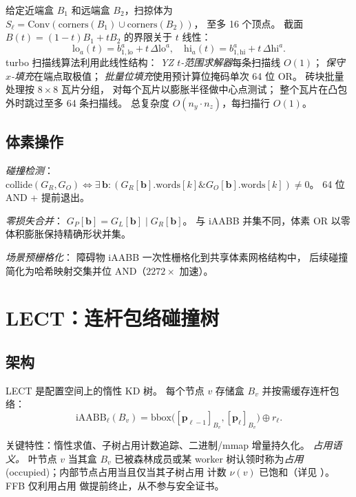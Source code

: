 \documentclass[journal]{IEEEtran}
\newcommand{\iAABB}{\mathrm{iAABB}}
\begin{document}
给定近端盒 $B_1$ 和远端盒 $B_2$，扫掠体为
$S_\ell = \mathrm{Conv}(\mathrm{corners}(B_1) \cup \mathrm{corners}(B_2))$，
至多 16 个顶点。
截面 $B(t) = (1-t)B_1 + tB_2$ 的界限关于 $t$ 线性：
\begin{equation}\label{eq:bt_linear}
  \mathrm{lo}_a(t) = b_{1,\mathrm{lo}}^a + t\,\Delta\mathrm{lo}^a, \quad
  \mathrm{hi}_a(t) = b_{1,\mathrm{hi}}^a + t\,\Delta\mathrm{hi}^a.
\end{equation}
turbo 扫描线算法利用此线性结构：
\emph{YZ $t$-范围求解器}每条扫描线 $O(1)$；
\emph{保守 $x$-填充}在端点取极值；
\emph{批量位填充}使用预计算位掩码单次 64 位 OR。
砖块批量处理按 $8{\times}8$ 瓦片分组，
对每个瓦片以膨胀半径做中心点测试；
整个瓦片在凸包外时跳过至多 64 条扫描线。
总复杂度 $O(n_y \cdot n_z)$，每扫描行 $O(1)$。

\subsection{体素操作}

\emph{碰撞检测}：
$\text{collide}(G_R, G_O) \Leftrightarrow \exists\,\bm{b}:
(G_R[\bm{b}].\text{words}[k] \mathbin{\&} G_O[\bm{b}].\text{words}[k]) \ne 0$。
64 位 AND + 提前退出。

\emph{零损失合并}：
$G_P[\bm{b}] = G_L[\bm{b}] \mathbin{|} G_R[\bm{b}]$。
与 iAABB 并集不同，体素 OR 以零体积膨胀保持精确形状并集。

\emph{场景预栅格化}：
障碍物 iAABB 一次性栅格化到共享体素网格结构中，
后续碰撞简化为哈希映射交集并位 AND（$2272{\times}$ 加速）。

\section{LECT：连杆包络碰撞树}\label{sec:lect}

\subsection{架构}

LECT 是配置空间上的惰性 KD 树。
每个节点 $v$ 存储盒 $B_v$ 并按需缓存连杆包络：
\begin{equation}
  \iAABB_\ell(B_v) = \mathrm{bbox}\bigl([\bm{p}_{\ell-1}]_{B_v},
  [\bm{p}_\ell]_{B_v}\bigr) \oplus r_\ell.
\end{equation}

关键特性：惰性求值、子树占用计数追踪、二进制/mmap 增量持久化。
\emph{占用语义。} 叶节点 $v$ 当其盒 $B_v$ 已被森林成员或某 worker
树认领时称为\emph{占用} (occupied)；内部节点占用当且仅当其子树占用
计数 $\nu(v)$ 已饱和（详见 ）。FFB 仅利用占用
做提前终止，从不参与安全证书。
\end{document}
